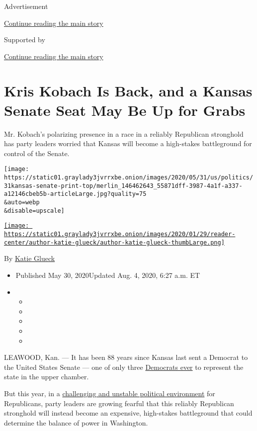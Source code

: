 Advertisement

\protect\hyperlink{after-top}{Continue reading the main story}

Supported by

\protect\hyperlink{after-sponsor}{Continue reading the main story}

\hypertarget{kris-kobach-is-back-and-a-kansas-senate-seat-may-be-up-for-grabs}{%
\section{Kris Kobach Is Back, and a Kansas Senate Seat May Be Up for
Grabs}\label{kris-kobach-is-back-and-a-kansas-senate-seat-may-be-up-for-grabs}}

Mr. Kobach's polarizing presence in a race in a reliably Republican
stronghold has party leaders worried that Kansas will become a
high-stakes battleground for control of the Senate.

\texttt{[image: https://static01.graylady3jvrrxbe.onion/images/2020/05/31/us/politics/31kansas-senate-print-top/merlin\_146462643\_55871dff-3987-4a1f-a337-a12146cbeb5b-articleLarge.jpg?quality=75\\\&auto=webp\\\&disable=upscale]}

\href{https://www.nytimes3xbfgragh.onion/by/katie-glueck}{\texttt{[image: https://static01.graylady3jvrrxbe.onion/images/2020/01/29/reader-center/author-katie-glueck/author-katie-glueck-thumbLarge.png]}}

By \href{https://www.nytimes3xbfgragh.onion/by/katie-glueck}{Katie
Glueck}

\begin{itemize}
\item
  Published May 30, 2020Updated Aug. 4, 2020, 6:27 a.m. ET
\item
  \begin{itemize}
  \item
  \item
  \item
  \item
  \item
  \end{itemize}
\end{itemize}

LEAWOOD, Kan. --- It has been 88 years since Kansas last sent a Democrat
to the United States Senate --- one of only three
\href{http://www.senate.gov/states/KS/senators.htm}{Democrats ever} to
represent the state in the upper chamber.

But this year, in a
\href{https://www.nytimes3xbfgragh.onion/2020/04/25/us/politics/trump-election-briefings.html}{challenging
and unstable political environment} for Republicans, party leaders are
growing fearful that this reliably Republican stronghold will instead
become an expensive, high-stakes battleground that could determine the
balance of power in Washington.

